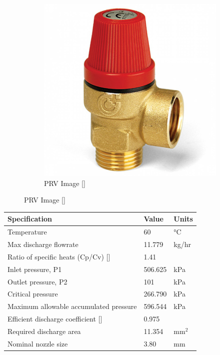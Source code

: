 \begin{figure}[H]
\begin{subfigure}{0.49\linewidth}
        \includegraphics[width=\linewidth]{chapters/Z-support/figures/product_a_l_altecnic-caleffi-safety-relief-valve-1-2-6-bar-312460-small.jpg}
        \caption{PRV Image []}
    \end{subfigure}
\end{figure}

\begin{table}[H]
\centering
\begin{tabular}{@{}l|l|l@{}}
\toprule
\textbf{Specification}                    & \textbf{Value} & \textbf{Units} \\ \midrule
Temperature                               & 60             & °C             \\ \midrule
Max discharge   flowrate                  & 11.779         & kg/hr          \\ \midrule
Ratio of   specific heats (Cp/Cv)  []       & 1.41           &                \\ \midrule
Inlet   pressure, P1                      & 506.625        & kPa            \\ \midrule
Outlet   pressure, P2                     & 101            & kPa            \\ \midrule
Critical   pressure                       & 266.790        & kPa            \\ \midrule
Maximum   allowable accumulated  pressure & 596.544        & kPa            \\ \midrule
Efficient   discharge coefficient  []        & 0.975          &                \\ \midrule
Required   discharge area                 & 11.354         & mm$^2$            \\ \midrule
Nominal nozzle   size                     & 3.80           & mm             \\ \bottomrule
\end{tabular}
\end{table}

